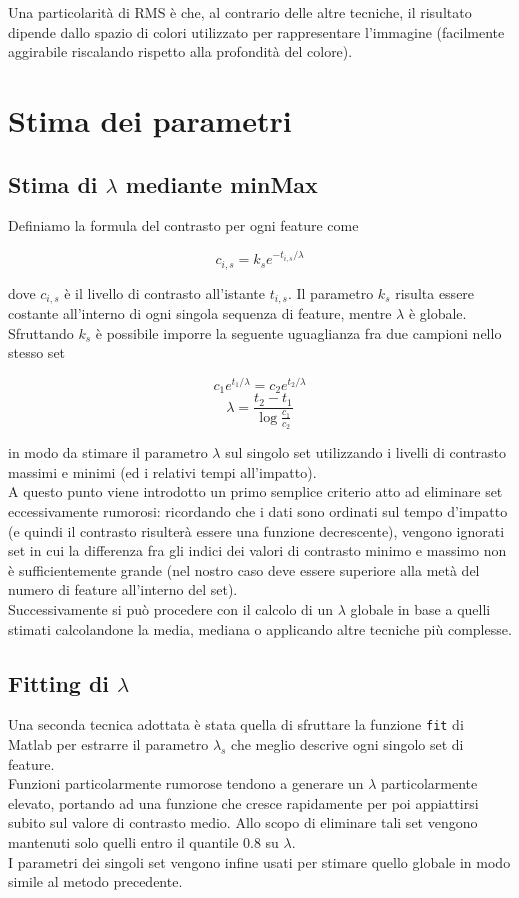 \documentclass[12pt]{report}
\begin{document}
\noindent Una particolarit\`a di RMS \`e che, al contrario delle altre tecniche, il risultato dipende dallo spazio di colori utilizzato per rappresentare l'immagine (facilmente aggirabile riscalando rispetto alla profondit\`a del colore).

\section{Stima dei parametri}

\subsection{Stima di $\lambda$ mediante minMax}

\noindent Definiamo la formula del contrasto per ogni feature come

$$ c_{i,s} = k_se^{-t_{i,s}/\lambda} $$

\noindent dove $c_{i,s}$ \`e il livello di contrasto all'istante $t_{i,s}$. Il parametro $k_s$ risulta essere costante all'interno di ogni singola sequenza di feature, mentre $\lambda$ \`e globale.
Sfruttando $k_s$ \`e possibile imporre la seguente uguaglianza fra due campioni nello stesso set

$$ c_1e^{t_1/\lambda} = c_2e^{t_2/\lambda} $$
$$ \lambda = \frac{t_2-t_1}{\log\frac{c_1}{c_2}} $$

\noindent in modo da stimare il parametro $\lambda$ sul singolo set utilizzando i livelli di contrasto massimi e minimi (ed i relativi tempi all'impatto).\\
A questo punto viene introdotto un primo semplice criterio atto ad eliminare set eccessivamente rumorosi: ricordando che i dati sono ordinati sul tempo d'impatto (e quindi il contrasto risulter\`a essere una funzione decrescente), vengono ignorati set in cui la differenza fra gli indici dei valori di contrasto minimo e massimo non \`e sufficientemente grande (nel nostro caso deve essere superiore alla met\`a del numero di feature all'interno del set).\\
Successivamente si pu\`o procedere con il calcolo di un $\lambda$ globale in base a quelli stimati calcolandone la media, mediana o applicando altre tecniche pi\`u complesse.

\subsection{Fitting di $\lambda$}
\noindent Una seconda tecnica adottata \`e stata quella di sfruttare la funzione \verb|fit| di Matlab per estrarre il parametro $\lambda_s$ che meglio descrive ogni singolo set di feature.\\
Funzioni particolarmente rumorose tendono a generare un $\lambda$ particolarmente elevato, portando ad una funzione che cresce rapidamente per poi appiattirsi subito sul valore di contrasto medio. Allo scopo di eliminare tali set vengono mantenuti solo quelli entro il quantile $0.8$ su $\lambda$.\\
I parametri dei singoli set vengono infine usati per stimare quello globale in modo simile al metodo precedente.
\end{document}
